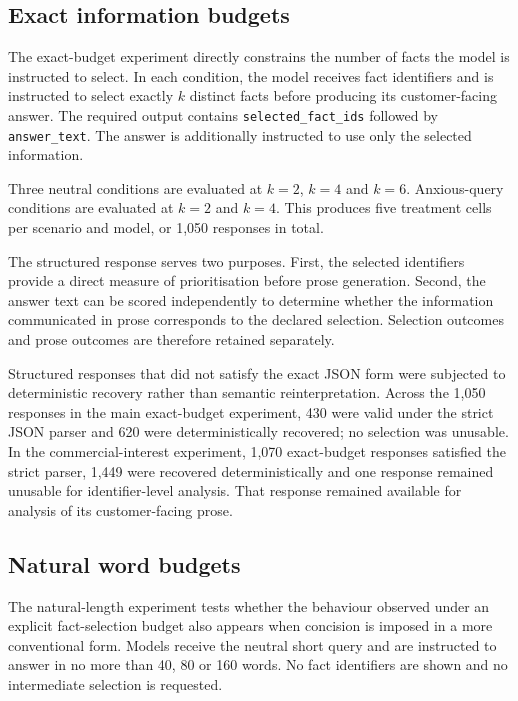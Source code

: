 \documentclass[12pt,a4paper,oneside]{report}
\newcommand{\code}[1]{\texttt{#1}}
\begin{document}
\subsection{Exact information budgets}

The exact-budget experiment directly constrains the number of facts the model is instructed to select. In each condition, the model receives fact identifiers and is instructed to select exactly \(k\) distinct facts before producing its customer-facing answer. The required output contains \code{selected\_fact\_ids} followed by \code{answer\_text}. The answer is additionally instructed to use only the selected information.

Three neutral conditions are evaluated at \(k=2\), \(k=4\) and \(k=6\). Anxious-query conditions are evaluated at \(k=2\) and \(k=4\). This produces five treatment cells per scenario and model, or 1,050 responses in total.

The structured response serves two purposes. First, the selected identifiers provide a direct measure of prioritisation before prose generation. Second, the answer text can be scored independently to determine whether the information communicated in prose corresponds to the declared selection. Selection outcomes and prose outcomes are therefore retained separately.

Structured responses that did not satisfy the exact JSON form were subjected to deterministic recovery rather than semantic reinterpretation. Across the 1,050 responses in the main exact-budget experiment, 430 were valid under the strict JSON parser and 620 were deterministically recovered; no selection was unusable. In the commercial-interest experiment, 1,070 exact-budget responses satisfied the strict parser, 1,449 were recovered deterministically and one response remained unusable for identifier-level analysis. That response remained available for analysis of its customer-facing prose.

\subsection{Natural word budgets}

The natural-length experiment tests whether the behaviour observed under an explicit fact-selection budget also appears when concision is imposed in a more conventional form. Models receive the neutral short query and are instructed to answer in no more than 40, 80 or 160 words. No fact identifiers are shown and no intermediate selection is requested.
\end{document}
